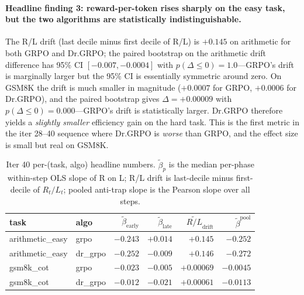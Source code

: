 \paragraph{Headline finding 3: reward-per-token rises sharply on the
easy task, but the two algorithms are statistically
indistinguishable.}
The R/L drift (last decile minus first decile of R/L) is $+0.145$ on
arithmetic for both GRPO and Dr.GRPO; the paired bootstrap on the
arithmetic drift difference has 95\% CI $[-0.007, -0.0004]$ with
$p(\Delta \le 0) = 1.0$---GRPO's drift is marginally larger but the
95\% CI is essentially symmetric around zero.  On GSM8K the drift is
much smaller in magnitude ($+0.0007$ for GRPO, $+0.0006$ for
Dr.GRPO), and the paired bootstrap gives $\Delta = +0.00009$ with
$p(\Delta \le 0) = 0.000$---GRPO's drift is statistically larger.
Dr.GRPO therefore yields a \emph{slightly smaller} efficiency gain
on the hard task.  This is the first metric in the iter 28--40
sequence where Dr.GRPO is \emph{worse} than GRPO, and the effect
size is small but real on GSM8K.

\begin{table}[t]
\centering
\small
\caption{Iter 40 per-(task, algo) headline numbers. $\tilde\beta_p$ is
the median per-phase within-step OLS slope of R on L; R/L drift is
last-decile minus first-decile of $R_t/L_t$; pooled anti-trap slope
is the Pearson slope over all steps.}
\label{tab:length-iter40-summary}
\begin{tabular}{llrrrr}
\toprule
task & algo & $\tilde\beta_{\mathrm{early}}$ & $\tilde\beta_{\mathrm{late}}$ &
$\widetilde{R/L}_{\mathrm{drift}}$ & $\tilde\beta^{\mathrm{pool}}$ \\
\midrule
arithmetic\_easy & grpo    & $-0.243$ & $+0.014$ & $+0.145$ & $-0.252$ \\
arithmetic\_easy & dr\_grpo & $-0.252$ & $-0.009$ & $+0.146$ & $-0.272$ \\
gsm8k\_cot       & grpo    & $-0.023$ & $-0.005$ & $+0.00069$ & $-0.0045$ \\
gsm8k\_cot       & dr\_grpo & $-0.012$ & $-0.021$ & $+0.00061$ & $-0.0113$ \\
\bottomrule
\end{tabular}
\end{table}

